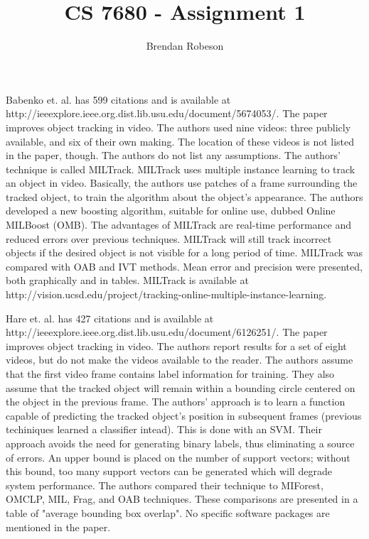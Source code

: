 \documentclass[11pt]{article}
\begin{document}
\title{CS 7680 - Assignment 1}
\author{Brendan Robeson}
\maketitle

Babenko et. al. \cite{5674053} has 599 citations and is available at \\ http://ieeexplore.ieee.org.dist.lib.usu.edu/document/5674053/. The paper improves object tracking in video. The authors used nine videos: three publicly available, and six of their own making. The location of these videos is not listed in the paper, though. The authors do not list any assumptions. The authors' technique is called MILTrack. MILTrack uses multiple instance learning to track an object in video. Basically, the authors use patches of a frame surrounding the tracked object, to train the algorithm about the object's appearance. The authors developed a new boosting algorithm, suitable for online use, dubbed Online MILBoost (OMB). The advantages of MILTrack are real-time performance and reduced errors over previous techniques. MILTrack will still track incorrect objects if the desired object is not visible for a long period of time. MILTrack was compared with OAB and IVT methods. Mean error and precision were presented, both graphically and in tables. MILTrack is available at http://vision.ucsd.edu/project/tracking-online-multiple-instance-learning.

Hare et. al. \cite{6126251} has 427 citations and is available at \\ http://ieeexplore.ieee.org.dist.lib.usu.edu/document/6126251/. The paper improves object tracking in video. The authors report results for a set of eight videos, but do not make the videos available to the reader. The authors assume that the first video frame contains label information for training. They also assume that the tracked object will remain within a bounding circle centered on the object in the previous frame. The authors' approach is to learn a function capable of predicting the tracked object's position in subsequent frames (previous techiniques learned a classifier intead). This is done with an SVM. Their approach avoids the need for generating binary labels, thus eliminating a source of errors. An upper bound is placed on the number of support vectors; without this bound, too many support vectors can be generated which will degrade system performance. The authors compared their technique to MIForest, OMCLP, MIL, Frag, and OAB techniques. These comparisons are presented in a table of "average bounding box overlap". No specific software packages are mentioned in the paper.
\end{document}
